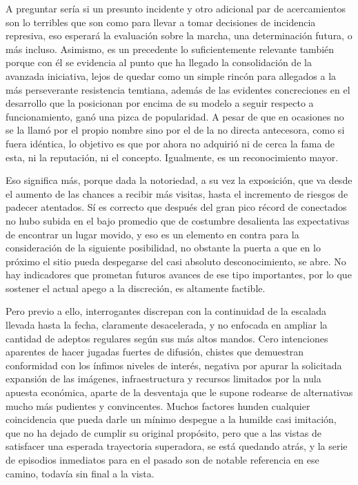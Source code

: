 \documentclass[
]{book}
\begin{document}
A preguntar sería si un presunto incidente y otro adicional par de acercamientos son lo terribles que son como para llevar a tomar decisiones de incidencia represiva, eso esperará la evaluación sobre la marcha, una determinación futura, o más incluso. Asimismo, es un precedente lo suficientemente relevante también porque con él se evidencia al punto que ha llegado la consolidación de la avanzada iniciativa, lejos de quedar como un simple rincón para allegados a la más perseverante resistencia temtiana, además de las evidentes concreciones en el desarrollo que la posicionan por encima de su modelo a seguir respecto a funcionamiento, ganó una pizca de popularidad. A pesar de que en ocasiones no se la llamó por el propio nombre sino por el de la no directa antecesora, como si fuera idéntica, lo objetivo es que por ahora no adquirió ni de cerca la fama de esta, ni la reputación, ni el concepto. Igualmente, es un reconocimiento mayor.

Eso significa más, porque dada la notoriedad, a su vez la exposición, que va desde el aumento de las chances a recibir más visitas, hasta el incremento de riesgos de padecer atentados. Sí es correcto que después del gran pico récord de conectados no hubo subida en el bajo promedio que de costumbre desalienta las expectativas de encontrar un lugar movido, y eso es un elemento en contra para la consideración de la siguiente posibilidad, no obstante la puerta a que en lo próximo el sitio pueda despegarse del casi absoluto desconocimiento, se abre. No hay indicadores que prometan futuros avances de ese tipo importantes, por lo que sostener el actual apego a la discreción, es altamente factible.

Pero previo a ello, interrogantes discrepan con la continuidad de la escalada llevada hasta la fecha, claramente desacelerada, y no enfocada en ampliar la cantidad de adeptos regulares según sus más altos mandos. Cero intenciones aparentes de hacer jugadas fuertes de difusión, chistes que demuestran conformidad con los ínfimos niveles de interés, negativa por apurar la solicitada expansión de las imágenes, infraestructura y recursos limitados por la nula apuesta económica, aparte de la desventaja que le supone rodearse de alternativas mucho más pudientes y convincentes. Muchos factores hunden cualquier coincidencia que pueda darle un mínimo despegue a la humilde casi imitación, que no ha dejado de cumplir su original propósito, pero que a las vistas de satisfacer una esperada trayectoria superadora, se está quedando atrás, y la serie de episodios inmediatos para en el pasado son de notable referencia en ese camino, todavía sin final a la vista.
\end{document}
